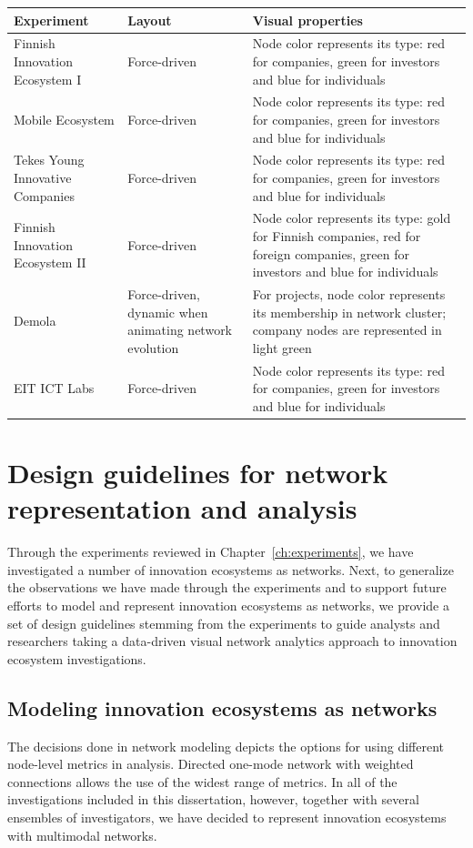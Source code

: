 \begingroup
{}\label{tab:networkvisualization}
\begin{tabular}{p{3cm} p{3cm} p{6cm}}
\toprule
Experiment & Layout & Visual properties \\
\midrule
Finnish Innovation Ecosystem I & 
Force-driven & 
Node color represents its type: red for companies, green for investors and blue for individuals  \\
Mobile Ecosystem &
Force-driven &
Node color represents its type: red for companies, green for investors and blue for individuals  \\
Tekes Young Innovative Companies &
Force-driven &
Node color represents its type: red for companies, green for investors and blue for individuals  \\
Finnish Innovation Ecosystem II  &
Force-driven &
Node color represents its type: gold for Finnish companies, red for foreign companies, green for investors and blue for individuals  \\
Demola &
Force-driven, dynamic when animating network evolution &
For projects, node color represents its membership in network cluster; company nodes are represented in light green \\
EIT ICT Labs &
Force-driven &
Node color represents its type: red for companies, green for investors and blue for individuals  \\
\bottomrule
\end{tabular}
\endgroup

\section{Design guidelines for network representation and analysis}
\label{sec:designguidelines}

Through the experiments reviewed in Chapter~\ref{ch:experiments}, we have investigated a number of innovation ecosystems as networks. Next, to generalize the observations we have made through the experiments and to support future efforts to model and represent innovation ecosystems as networks, we provide a set of design guidelines stemming from the experiments to guide analysts and researchers taking a data-driven visual network analytics approach to innovation ecosystem investigations.

\subsection{Modeling innovation ecosystems as networks}
The decisions done in network modeling depicts the options for using different node-level metrics in analysis. Directed one-mode network with weighted connections allows the use of the widest range of metrics. In all of the investigations included in this dissertation, however, together with several ensembles of investigators, we have decided to represent innovation ecosystems with multimodal networks.

